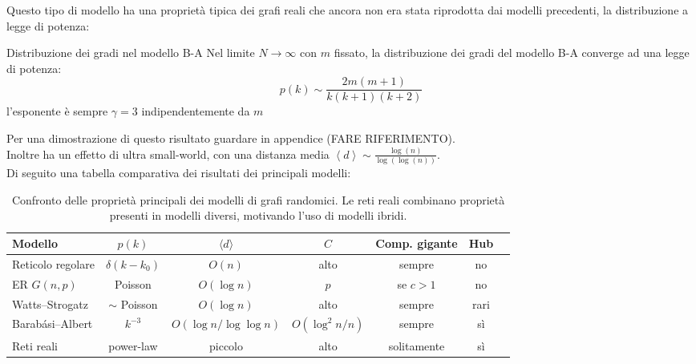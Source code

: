 Questo tipo di modello ha una proprietà tipica dei grafi reali che ancora non era stata riprodotta dai modelli precedenti, la distribuzione a legge di potenza:
\begin{boxl}{Distribuzione dei gradi nel modello B-A}
Nel limite $N \to \infty$ con $m$ fissato, la distribuzione dei gradi del modello B-A converge ad una legge di potenza: 
\begin{equation}
  p(k) \sim \frac{2m(m+1)}{k(k+1)(k+2)}
\end{equation}
l'esponente è sempre $\gamma=3$ indipendentemente da $m$
\end{boxl}
Per una dimostrazione di questo risultato guardare in appendice (FARE RIFERIMENTO).\\

Inoltre ha un effetto di ultra small-world, con una distanza media $\left\langle d \right\rangle \sim \frac{\log(n)}{\log(\log(n))}$.\\

Di seguito una tabella comparativa dei risultati dei principali modelli:
\begin{table}[htbp]
\centering
\caption{Confronto delle proprietà principali dei modelli di grafi randomici. Le reti reali combinano proprietà presenti in modelli diversi, motivando l'uso di modelli ibridi.}
\label{tab:confronto_modelli}
\begin{tabular}{@{}lcccccc@{}}
\toprule
\textbf{Modello} & $p(k)$ & $\langle d \rangle$ & $C$ & \textbf{Comp. gigante} & \textbf{Hub} \\
\midrule
Reticolo regolare          & $\delta(k - k_0)$               & $O(n)$ & alto & sempre & no \\
ER $G(n,p)$                & Poisson                         & $O(\log n)$ & $p$ & se $c > 1$ & no \\
Watts–Strogatz             & $\sim$ Poisson                  & $O(\log n)$ & alto & sempre & rari \\
Barabási–Albert            & $k^{-3}$                       & $O(\log n / \log \log n)$ & $O(\log^2 n / n)$ & sempre & sì \\
Reti reali                 & power-law                      & piccolo & alto & solitamente & sì \\
\bottomrule
\end{tabular}
\end{table}

